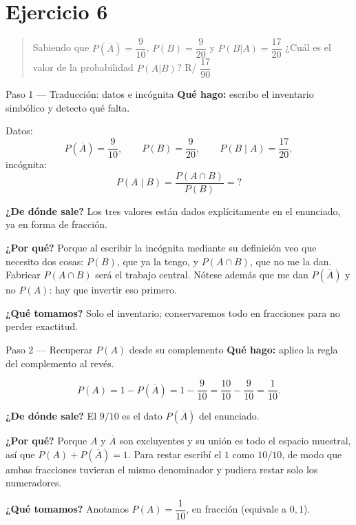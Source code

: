 \documentclass[11pt]{article}
\begin{document}
\section*{Ejercicio 6}

\begin{quote}
Sabiendo que $P(\overline{A}) = \dfrac{9}{10}$, $P(B) = \dfrac{9}{20}$ y $P(B|A) = \dfrac{17}{20}$ ¿Cuál es el valor de la probabilidad $P(A|B)$? \hfill R/ $\dfrac{17}{90}$
\end{quote}

\begin{paso}{Paso 1 --- Traducción: datos e incógnita}
\textbf{Qué hago:} escribo el inventario simbólico y detecto qué falta.

Datos:
\[
P(\overline{A})=\frac{9}{10},\qquad P(B)=\frac{9}{20},\qquad P(B\mid A)=\frac{17}{20},
\]
incógnita:
\[
P(A\mid B)=\frac{P(A\cap B)}{P(B)}=?
\]

\textbf{¿De dónde sale?} Los tres valores están dados explícitamente en el enunciado, ya en forma de fracción.

\textbf{¿Por qué?} Porque al escribir la incógnita mediante su definición veo que necesito dos cosas: $P(B)$, que ya la tengo, y $P(A\cap B)$, que no me la dan. Fabricar $P(A\cap B)$ será el trabajo central. Nótese además que me dan $P(\overline{A})$ y no $P(A)$: hay que invertir eso primero.

\textbf{¿Qué tomamos?} Solo el inventario; conservaremos todo en fracciones para no perder exactitud.
\end{paso}

\begin{paso}{Paso 2 --- Recuperar $P(A)$ desde su complemento}
\textbf{Qué hago:} aplico la regla del complemento al revés.

\[
P(A)=1-P(\overline{A})=1-\frac{9}{10}=\frac{10}{10}-\frac{9}{10}=\frac{1}{10}.
\]

\textbf{¿De dónde sale?} El $9/10$ es el dato $P(\overline{A})$ del enunciado.

\textbf{¿Por qué?} Porque $A$ y $\overline{A}$ son excluyentes y su unión es todo el espacio muestral, así que $P(A)+P(\overline{A})=1$. Para restar escribí el $1$ como $10/10$, de modo que ambas fracciones tuvieran el mismo denominador y pudiera restar solo los numeradores.

\textbf{¿Qué tomamos?} Anotamos $P(A)=\dfrac{1}{10}$, en fracción (equivale a $0{,}1$).
\end{paso}
\end{document}
